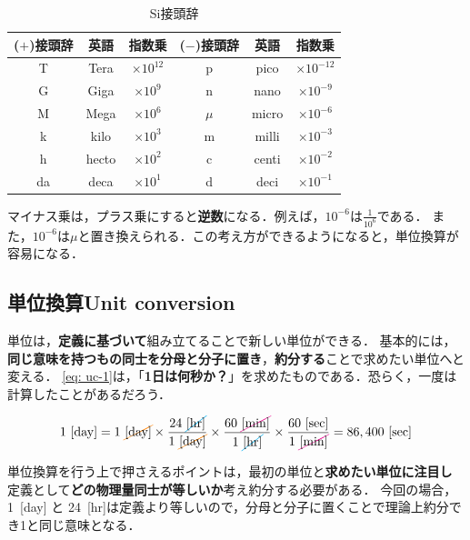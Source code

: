 \documentclass[a4paper,11pt]{ltjsarticle}
\numberwithin{equation}{section}
\newcommand{\Cancel}[2][black]{{\color{#1}\cancel{\color{black}#2}}}
\begin{document}
\begin{table}[htbp]
  \caption{Si接頭辞}
  \label{tab: prefix}
  \centering
  \begin{tabular}{cccccc}
    \hline
    ($+$)接頭辞 & 英語 & 指数乗 & ($-$)接頭辞 & 英語 & 指数乗 \\
    \hline
    T & {\color{cyan}T}era & $\times 10^{12}$ & p & {\color{cyan}p}ico & $\times 10^{-12}$ \\
    G & {\color{cyan}G}iga & $\times 10^{9}$ & n & {\color{cyan}n}ano & $\times 10^{-9}$ \\
    M & {\color{cyan}M}ega & $\times 10^{6}$ & $\mu$ & micro & $\times 10^{-6}$ \\
    k & {\color{cyan}k}ilo & $\times 10^{3}$ & m & {\color{cyan}m}illi & $\times 10^{-3}$ \\
    h & {\color{cyan}h}ecto & $\times 10^{2}$ & c & {\color{cyan}c}enti & $\times 10^{-2}$ \\
    da & {\color{cyan}d}ec{\color{cyan}a} & $\times 10^{1}$ & d & {\color{cyan}d}eci & $\times 10^{-1}$ \\
    \hline
  \end{tabular}
\end{table}

マイナス乗は，プラス乗にすると\textbf{逆数}になる．例えば，$10^{-6}$は$\tfrac{1}{10^6}$である．
また，$10^{-6}$は$\mu$と置き換えられる．この考え方ができるようになると，単位換算が容易になる．

\subsection{単位換算Unit conversion}
\label{sec: convertion}

単位は，\textbf{定義に基づいて}組み立てることで新しい単位ができる．
基本的には，\textbf{同じ意味を持つもの同士を分母と分子に置き}，{\color{cyan}\textbf{約分する}}ことで求めたい単位へと変える．
\cref{eq: uc-1}は，「\textbf{1日は何秒か？}」を求めたものである．恐らく，一度は計算したことがあるだろう．

\begin{equation}
  1\ [\mathrm{day}] = 1\ \Cancel[orange]{[\mathrm{day}]} \times \frac{24\ \Cancel[cyan]{[\mathrm{hr}]}}{1\ \Cancel[orange]{[\mathrm{day}]}} \times \frac{60\ \Cancel[magenta]{[\mathrm{min}]}}{1\ \Cancel[cyan]{[\mathrm{hr}]}} \times \frac{60\ [\mathrm{sec}]}{1\ \Cancel[magenta]{[\mathrm{min}]}} = 86,400\ [\mathrm{sec}] \label{eq: uc-1}
\end{equation}

単位換算を行う上で押さえるポイントは，最初の単位と\textbf{求めたい単位に注目し}
定義として\textbf{どの物理量同士が等しいか}考え約分する必要がある．
今回の場合，1\ [day] と 24\ [hr]は定義より等しいので，分母と分子に置くことで理論上約分でき1と同じ意味となる．
\end{document}
